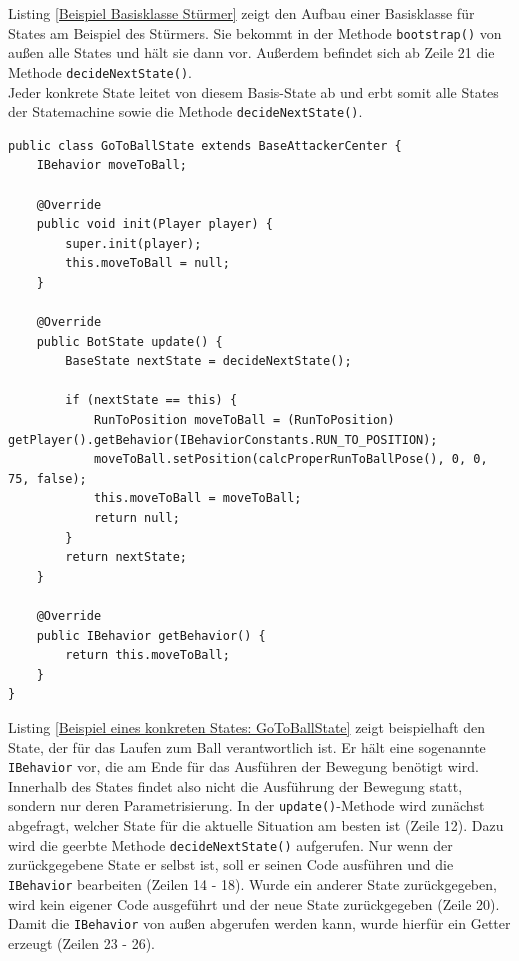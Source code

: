 \documentclass[fontsize=12pt,a4paper,final]{scrartcl}[2003/01/01]
\begin{document}
Listing \ref{Beispiel Basisklasse Stürmer} zeigt den Aufbau einer Basisklasse für States am Beispiel des Stürmers. Sie bekommt in der Methode \lstinline$bootstrap()$ von außen alle States und hält sie dann vor. Außerdem befindet sich ab Zeile 21 die Methode \lstinline$decideNextState()$.
\\

Jeder konkrete State leitet von diesem Basis-State ab und erbt somit alle States der Statemachine sowie die Methode \lstinline$decideNextState()$.
\\

\begin{lstlisting}[caption=Beispiel eines konkreten States: GoToBallState, captionpos=b, label=Beispiel eines konkreten States: GoToBallState]
public class GoToBallState extends BaseAttackerCenter {
    IBehavior moveToBall;

    @Override
    public void init(Player player) {
        super.init(player);
        this.moveToBall = null;
    }

    @Override
    public BotState update() {
        BaseState nextState = decideNextState();

        if (nextState == this) {
            RunToPosition moveToBall = (RunToPosition) getPlayer().getBehavior(IBehaviorConstants.RUN_TO_POSITION);
            moveToBall.setPosition(calcProperRunToBallPose(), 0, 0, 75, false);
            this.moveToBall = moveToBall;
            return null;
        }
        return nextState;
    }

    @Override
    public IBehavior getBehavior() {
        return this.moveToBall;
    }
}
\end{lstlisting}

Listing \ref{Beispiel eines konkreten States: GoToBallState} zeigt beispielhaft den State, der für das Laufen zum Ball verantwortlich ist. Er hält eine sogenannte \lstinline$IBehavior$ vor, die am Ende für das Ausführen der Bewegung benötigt wird. Innerhalb des States findet also nicht die Ausführung der Bewegung statt, sondern nur deren Parametrisierung. In der \lstinline$update()$-Methode wird zunächst abgefragt, welcher State für die aktuelle Situation am besten ist (Zeile 12). Dazu wird die geerbte Methode \lstinline$decideNextState()$ aufgerufen. Nur wenn der zurückgegebene State er selbst ist, soll er seinen Code ausführen und die \lstinline$IBehavior$ bearbeiten (Zeilen 14 - 18). Wurde ein anderer State zurückgegeben, wird kein eigener Code ausgeführt und der neue State zurückgegeben (Zeile 20). Damit die \lstinline$IBehavior$ von außen abgerufen werden kann, wurde hierfür ein Getter erzeugt (Zeilen 23 - 26).
\pagebreak
\end{document}
